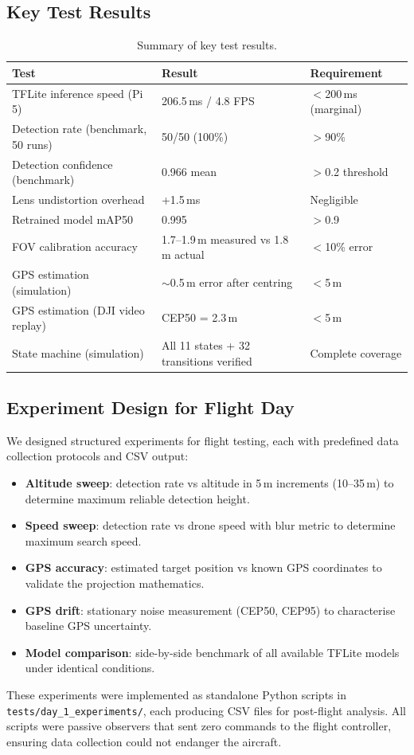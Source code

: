 \subsection{Key Test Results}

\begin{table}[htbp]
\centering
\compactTable
\caption{Summary of key test results.}
\label{tab:test_results}
\begin{tabularx}{\linewidth}{X l l}
\toprule
\textbf{Test} & \textbf{Result} & \textbf{Requirement} \\
\midrule
TFLite inference speed (Pi 5) & 206.5\,ms / 4.8 FPS & $<$200\,ms (marginal) \\
Detection rate (benchmark, 50 runs) & 50/50 (100\%) & $>$90\% \\
Detection confidence (benchmark) & 0.966 mean & $>$0.2 threshold \\
Lens undistortion overhead & +1.5\,ms & Negligible \\
Retrained model mAP50 & 0.995 & $>$0.9 \\
FOV calibration accuracy & 1.7--1.9\,m measured vs 1.8\,m actual & $<$10\% error \\
GPS estimation (simulation) & $\sim$0.5\,m error after centring & $<$5\,m \\
GPS estimation (DJI video replay) & CEP50 = 2.3\,m & $<$5\,m \\
State machine (simulation) & All 11 states + 32 transitions verified & Complete coverage \\
\bottomrule
\end{tabularx}
\end{table}

\subsection{Experiment Design for Flight Day}

We designed structured experiments for flight testing, each with predefined data collection protocols and CSV output:

\begin{itemize}
  \item \textbf{Altitude sweep}: detection rate vs altitude in 5\,m increments (10--35\,m) to determine maximum reliable detection height.
  \item \textbf{Speed sweep}: detection rate vs drone speed with blur metric to determine maximum search speed.
  \item \textbf{GPS accuracy}: estimated target position vs known GPS coordinates to validate the projection mathematics.
  \item \textbf{GPS drift}: stationary noise measurement (CEP50, CEP95) to characterise baseline GPS uncertainty.
  \item \textbf{Model comparison}: side-by-side benchmark of all available TFLite models under identical conditions.
\end{itemize}

These experiments were implemented as standalone Python scripts in \texttt{tests/day\_1\_experiments/}, each producing CSV files for post-flight analysis. All scripts were passive observers that sent zero commands to the flight controller, ensuring data collection could not endanger the aircraft.
